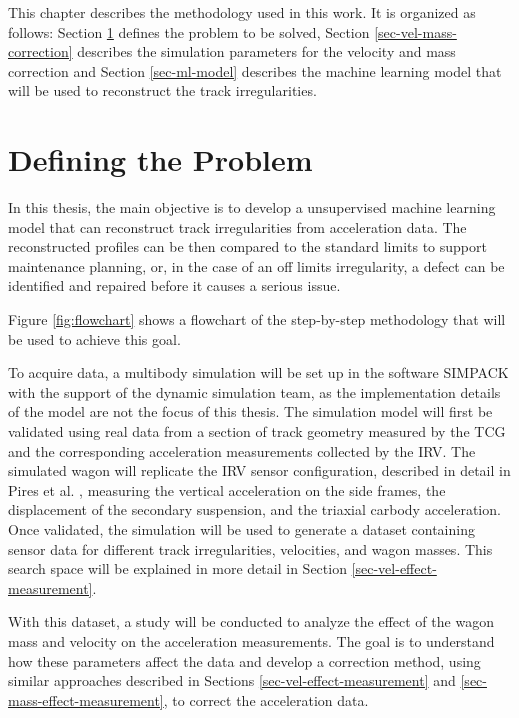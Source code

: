 This chapter describes the methodology used in this work. It is organized as follows: Section \ref{sec-defining-problem} defines the problem to be solved, Section \ref{sec-vel-mass-correction} describes the simulation parameters for the velocity and mass correction and Section \ref{sec-ml-model} describes the machine learning model that will be used to reconstruct the track irregularities.

\section{Defining the Problem} \label{sec-defining-problem}

In this thesis, the main objective is to develop a unsupervised machine learning model that can reconstruct track irregularities from acceleration data. The reconstructed profiles can be then compared to the standard limits to support maintenance planning, or, in the case of an off limits irregularity, a defect can be identified and repaired before it causes a serious issue.

Figure \ref{fig:flowchart} shows a flowchart of the step-by-step methodology that will be used to achieve this goal. 

To acquire data, a multibody simulation will be set up in the software SIMPACK with the support of the dynamic simulation team, as the implementation details of the model are not the focus of this thesis. The simulation model will first be validated using real data from a section of track geometry measured by the TCG and the corresponding acceleration measurements collected by the IRV. The simulated wagon will replicate the IRV sensor configuration, described in detail in Pires et al. \cite{PIRES2024107191}, measuring the vertical acceleration on the side frames, the displacement of the secondary suspension, and the triaxial carbody acceleration. Once validated, the simulation will be used to generate a dataset containing sensor data for different track irregularities, velocities, and wagon masses. This search space will be explained in more detail in Section \ref{sec-vel-effect-measurement}.

With this dataset, a study will be conducted to analyze the effect of the wagon mass and velocity on the acceleration measurements. The goal is to understand how these parameters affect the data and develop a correction method, using similar approaches described in Sections \ref{sec-vel-effect-measurement} and \ref{sec-mass-effect-measurement}, to correct the acceleration data.

